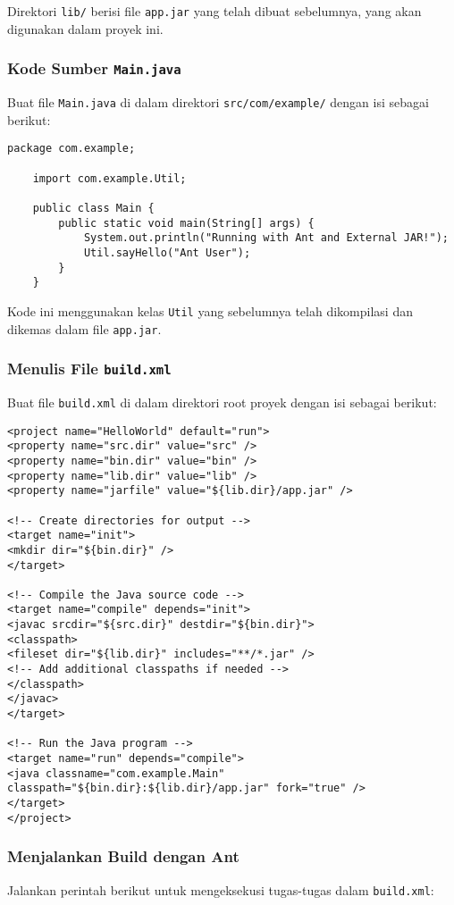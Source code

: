 Direktori \texttt{lib/} berisi file \texttt{app.jar} yang telah dibuat sebelumnya, yang akan digunakan dalam proyek ini.

\subsubsection{Kode Sumber \texttt{Main.java}}
Buat file \texttt{Main.java} di dalam direktori \texttt{src/com/example/} dengan isi sebagai berikut:

\begin{lstlisting}[style=JavaStyle]
	package com.example;
	
	import com.example.Util;
	
	public class Main {
		public static void main(String[] args) {
			System.out.println("Running with Ant and External JAR!");
			Util.sayHello("Ant User");
		}
	}
\end{lstlisting}

Kode ini menggunakan kelas \texttt{Util} yang sebelumnya telah dikompilasi dan dikemas dalam file \texttt{app.jar}.

\subsubsection{Menulis File \texttt{build.xml}}
Buat file \texttt{build.xml} di dalam direktori root proyek dengan isi sebagai berikut:

\begin{lstlisting}[style=XmlStyle]
<project name="HelloWorld" default="run">
<property name="src.dir" value="src" />
<property name="bin.dir" value="bin" />
<property name="lib.dir" value="lib" />
<property name="jarfile" value="${lib.dir}/app.jar" />

<!-- Create directories for output -->
<target name="init">
<mkdir dir="${bin.dir}" />
</target>

<!-- Compile the Java source code -->
<target name="compile" depends="init">
<javac srcdir="${src.dir}" destdir="${bin.dir}">
<classpath>
<fileset dir="${lib.dir}" includes="**/*.jar" />
<!-- Add additional classpaths if needed -->
</classpath>
</javac>
</target>

<!-- Run the Java program -->
<target name="run" depends="compile">
<java classname="com.example.Main" classpath="${bin.dir}:${lib.dir}/app.jar" fork="true" />
</target>
</project>

\end{lstlisting}

\subsubsection{Menjalankan Build dengan Ant}
Jalankan perintah berikut untuk mengeksekusi tugas-tugas dalam \texttt{build.xml}:

